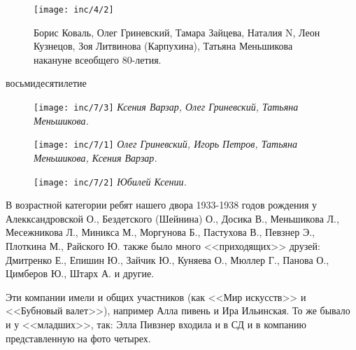 \begin{figure}[h!]
    \texttt{[image: inc/4/2]}
    \caption{Борис Коваль, Олег Гриневский, Тамара Зайцева, Наталия N, Леон Кузнецов, Зоя Литвинова (Карпухина), Татьяна Меньшикова накануне всеобщего 80-летия.}
\end{figure}

\newpage

\begin{center}
{ восьмидесятилетие}
\end{center}
\vspace{-10pt}
\begin{figure}[h!]
    \begin{minipage}{80mm}
    \texttt{[image: inc/7/3]}
    \textit{\footnotesize{Ксения Варзар, Олег Гриневский, Татьяна Меньшикова.}}
    \end{minipage}
\end{figure}
\vfill
\begin{figure}[h!]
    \begin{minipage}{80mm}
    \texttt{[image: inc/7/1]}
    \textit{\footnotesize{Олег Гриневский, Игорь Петров, Татьяна Меньшикова, Ксения Варзар.}}
    \end{minipage}
\end{figure}
\vfill
\begin{figure}[h!]
    \begin{minipage}{80mm}
    \texttt{[image: inc/7/2]}
    \textit{\footnotesize{Юбилей Ксении.}}
    \end{minipage}
\end{figure}

\restoregeometry

\newpage

В возрастной категории ребят нашего двора 1933-1938 годов рождения у Алекксандровской О., Бездетского (Шейнина) О., Досика В., Меньшикова Л., Месежникова Л., Миникса М., Моргунова Б., Пастухова В., Певзнер Э., Плоткина М., Райского Ю. также было много <<приходящих>> друзей: Дмитренко Е., Епишин Ю., Зайчик Ю., Куняева О., Мюллер Г., Панова О., Цимберов Ю., Штарх А. и другие.

Эти компании имели и общих участников (как <<Мир искусств>> и <<Бубновый валет>>), например Алла пивень и Ира Ильинская. То же бывало и у <<младших>>, так: Элла Пивзнер входила и в СД и в компанию представленную на фото четырех.


\indent

